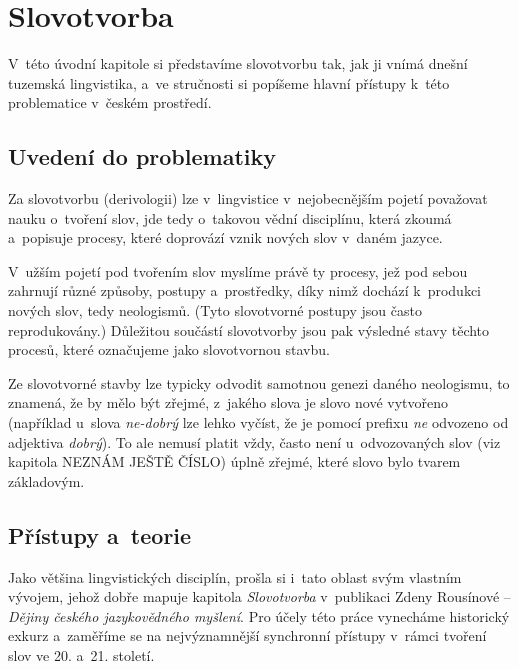 \hypertarget{slovotvorba}{%
\chapter{Slovotvorba}\label{slovotvorba}}

V~této úvodní kapitole si představíme slovotvorbu tak, jak ji vnímá
dnešní tuzemská lingvistika, a~ve stručnosti si popíšeme hlavní přístupy
k~této problematice v~českém prostředí.

\hypertarget{uvedenuxed-do-problematiky}{%
\section{Uvedení do problematiky}\label{uvedenuxed-do-problematiky}}

Za slovotvorbu (derivologii) lze v~lingvistice v~nejobecnějším pojetí
považovat nauku o~tvoření slov, jde tedy o~takovou vědní disciplínu,
která zkoumá a~popisuje procesy, které doprovází vznik nových slov
v~daném jazyce.

V~užším pojetí pod tvořením slov myslíme právě ty procesy, jež pod sebou
zahrnují různé způsoby, postupy a~prostředky, díky nimž dochází
k~produkci nových slov, tedy neologismů. (Tyto slovotvorné postupy jsou
často reprodukovány.) Důležitou součástí slovotvorby jsou pak výsledné
stavy těchto procesů, které označujeme jako slovotvornou stavbu.
\parencite[92]{cechova00}

Ze slovotvorné stavby lze typicky odvodit samotnou genezi daného
neologismu, to znamená, že by mělo být zřejmé, z~jakého slova je slovo
nové vytvořeno (například u~slova \emph{ne-dobrý} lze lehko vyčíst, že
je pomocí prefixu \emph{ne} odvozeno od adjektiva \emph{dobrý}). To ale
nemusí platit vždy, často není u~odvozovaných slov (viz kapitola NEZNÁM
JEŠTĚ ČÍSLO) úplně zřejmé, které slovo bylo tvarem základovým.
\parencite[92--93]{cechova00}

\hypertarget{pux159uxedstupy-a-teorie}{%
\section{Přístupy a~teorie}\label{pux159uxedstupy-a-teorie}}

Jako většina lingvistických disciplín, prošla si i~tato oblast svým
vlastním vývojem, jehož dobře mapuje kapitola \emph{Slovotvorba}
v~publikaci Zdeny Rousínové -- \emph{Dějiny českého jazykovědného
myšlení}. Pro účely této práce vynecháme historický exkurz a~zaměříme se
na nejvýznamnější synchronní přístupy v~rámci tvoření slov ve 20. a~21.
století.

